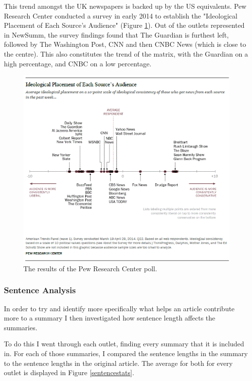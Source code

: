 \documentclass[12pt]{article}
\begin{document}
This trend amongst the UK newspapers is backed up by the US equivalents. Pew Research Center conducted a survey in early 2014 to establish the "Ideological Placement of Each Source's Audience" (Figure \ref{pewresearch}). Out of the outlets represented in NewSumm, the survey findings found that The Guardian is furthest left, followed by The Washington Post, CNN and then CNBC News (which is close to the centre). This also constitutes the trend of the matrix, with the Guardian on a high percentage, and CNBC on a low percentage.

\begin{figure}[ht!]
  \centering
    \includegraphics[scale=0.6]{pewresearch.png}
   \caption[A graph depicting responses to the User Interface Survey]{The results of the Pew Research Center poll.}
   \label{pewresearch}
\end{figure}

\subsubsection{Sentence Analysis}

In order to try and identify more specifically what helps an article contribute more to a summary I then investigated how sentence length affects the summaries.

To do this I went through each outlet, finding every summary that it is included in. For each of those summaries, I compared the sentence lengths in the summary to the sentence lengths in the original article. The average for both for every outlet is displayed in Figure \ref{sentencestats}.
\end{document}
